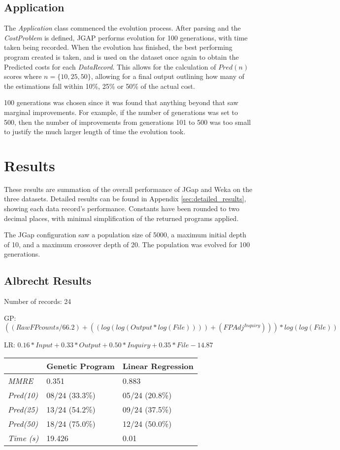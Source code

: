 \documentclass[11pt, a4paper]{article}
\begin{document}
\subsection{Application} %
\label{sub:application}
The \emph{Application} class commenced the evolution process. After parsing and
the \emph{CostProblem} is defined, JGAP performs evolution for 100 generations,
with time taken being recorded. When the evolution has finished, the best
performing program created is taken, and is used on the dataset once again to
obtain the Predicted costs for each \emph{DataRecord}. This allows for the
calculation of \(Pred(n)\) scores where \(n = \{10, 25, 50\}\), allowing for a
final output outlining how many of the estimations fall within 10\%, 25\% or
50\% of the actual cost.

100 generations was chosen since it was found that anything beyond that saw
marginal improvements. For example, if the number of generations was set to 500,
then the number of improvements from generations 101 to 500 was too small to
justify the much larger length of time the evolution took.
\newpage
\section{Results} %
\label{sec:results}
These results are summation of the overall performance of JGap and Weka on the
three datasets. Detailed results can be found in Appendix
\ref{sec:detailed_results}, showing each data record's performance.
Constants have been rounded to two decimal places, with minimal simplification
of the returned programs applied.

The JGap configuration saw a population size of 5000, a maximum initial depth of
10, and a maximum crossover depth of 20. The population was evolved for 100
generations.

\subsection{Albrecht Results} %
\label{sub:albrecht_results}
Number of records: 24

GP:
\(((RawFPcounts / 66.2) + ((log (log (Output * log (File)))) +
(FPAdj ^ {Inquiry}))) * log (log (File))\)

LR:
\(0.16 * Input + 0.33 * Output + 0.50 * Inquiry + 0.35 * File - 14.87\)

\begin{tabularx}{\textwidth}{| l | X | X |}
\hline
 & \textbf{Genetic Program} & \textbf{Linear Regression} \\
\hline
\emph{MMRE} & 0.351 & 0.883 \\
\hline
\emph{Pred(10)} & 08/24 (33.3\%) & 05/24 (20.8\%) \\
\emph{Pred(25)} & 13/24 (54.2\%) & 09/24 (37.5\%) \\
\emph{Pred(50)} & 18/24 (75.0\%) & 12/24 (50.0\%) \\
\hline
\emph{Time (s)} & 19.426 & 0.01 \\
\hline
\end{tabularx}
\end{document}
